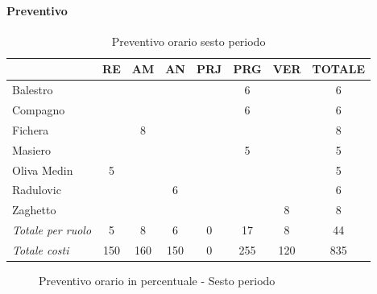 \documentclass[a4paper,12pt]{article}
\begin{document}
            \paragraph{Preventivo}
                \begin{table}[H]
                \centering
                \caption{Preventivo orario sesto periodo}
                \begin{tabular}{|l|c|c|c|c|c|c|c|}
                \hline
                    \rowcolor{lightgray}{\textbf{Membro}} & {\textbf{RE}} & {\textbf{AM}} & {\textbf{AN}} & {\textbf{PRJ}} & {\textbf{PRG}} & {\textbf{VER}} & {\textbf{TOTALE}}\\
                \hline
                    Balestro & & & & & 6 & & 6\\
                \hline
                    Compagno & & & & & 6 & & 6\\
                \hline
                    Fichera & & 8 & & & & & 8\\
                \hline
                    Masiero & & & & & 5 & & 5\\
                \hline
                    Oliva Medin & 5 & & & & & & 5\\
                \hline
                    Radulovic & & & 6 & & & & 6\\
                \hline
                    Zaghetto & & & & & & 8 & 8\\
                \hline
                    \rowcolor{lightgray}\textit{Totale per ruolo} & 5 & 8 & 6 & 0 & 17 & 8 & 44\\
                \hline
                    \rowcolor{lightgray}\textit{Totale costi} & 150 & 160 & 150 & 0 & 255 & 120 & 835\\
                \hline
                \end{tabular}
                \end{table}

                \begin{figure}[H]
                \centering
                \caption{Preventivo orario in percentuale - Sesto periodo}
                \end{figure}
                
\end{document}
